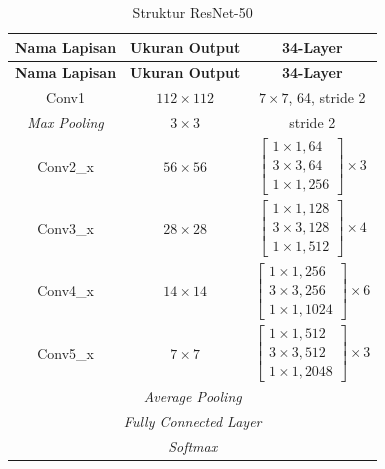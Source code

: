 \begingroup
\renewcommand{\arraystretch}{1.3} %
\setlength{\tabcolsep}{12pt} %
\begin{longtable}{|c|c|c|} %
	\caption{Struktur ResNet-50 \cite{he2015deepresiduallearningimage}}
	\label{table:resnet50}\\
	\hline
	\textbf{Nama Lapisan} & \textbf{Ukuran Output} & \textbf{34-Layer} \\
	\hline
	\endfirsthead %
	\hline
	\textbf{Nama Lapisan} & \textbf{Ukuran Output} & \textbf{34-Layer} \\
	\hline
	\endhead %
	Conv1 & $112 \times 112$ & $7 \times 7$, 64, stride 2\\ 
	\hline
	\textit{Max Pooling} & $3 \times 3$ & stride 2\\ 
	\hline
	Conv2\_x & $56 \times 56$ & $\left[\begin{array}{c} 1 \times 1, 64 \\ 3 \times 3, 64 \\ 1 \times 1, 256 \end{array}\right] \times 3$\\ 
	\hline
	Conv3\_x & $28 \times 28$ & $\left[\begin{array}{c} 1 \times 1, 128 \\ 3 \times 3, 128 \\ 1 \times 1, 512 \end{array}\right] \times 4$\\ 
	\hline
	Conv4\_x & $14 \times 14$ & $\left[\begin{array}{c} 1 \times 1, 256 \\ 3 \times 3, 256 \\ 1 \times 1, 1024 \end{array}\right] \times 6$\\ 
	\hline
	Conv5\_x & $7 \times 7$ & $\left[\begin{array}{c} 1 \times 1, 512 \\ 3 \times 3, 512 \\ 1 \times 1, 2048 \end{array}\right] \times 3$\\ 
	\hline
	\multicolumn{3}{|c|}{\textit{Average Pooling}}\\ 
	\hline
	\multicolumn{3}{|c|}{\textit{Fully Connected Layer}}\\ 
	\hline
	\multicolumn{3}{|c|}{\textit{Softmax}}\\ 
	\hline
\end{longtable}
\endgroup

